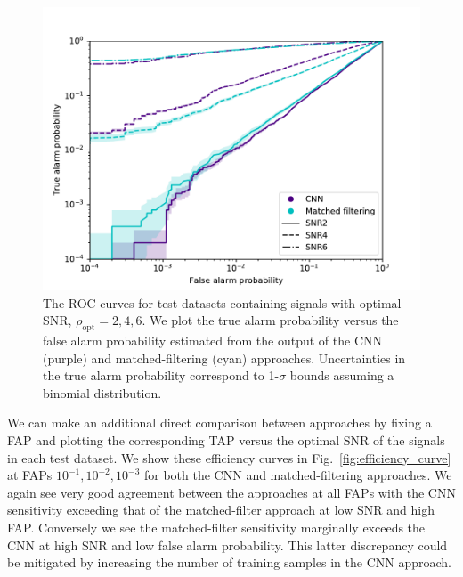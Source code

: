 %
%
\begin{figure}[]
\includegraphics[width=\columnwidth] {figures/ROC_curves.pdf}
\caption[Receiver operating characteristic curves for test datasets containing signals with optimal signal to noise ratio, $\rho_{\mathrm{opt}}=2,4,6$]{The \ac{ROC} curves for test datasets containing signals with optimal \ac{SNR}, $\rho_{\mathrm{opt}}=2,4,6$. We plot the true alarm probability versus the false alarm probability estimated from the output of the \ac{CNN} (purple) and matched-filtering (cyan) approaches. Uncertainties in the true alarm probability correspond to 1-$\sigma$ bounds assuming a binomial distribution.} \label{fig:ROC_curves} 
\end{figure}

%
%
We can make an additional direct comparison between approaches by fixing a 
\ac{FAP} and plotting the corresponding \ac{TAP} versus the optimal 
\ac{SNR} of the signals in each test dataset. We show these efficiency 
curves in Fig.~\ref{fig:efficiency_curve} at \ac{FAP}s 
$10^{-1},10^{-2},10^{-3}$ for both the \ac{CNN} and matched-filtering 
approaches. We again see very good agreement between the approaches at all 
\ac{FAP}s with the \ac{CNN} sensitivity exceeding that of the 
matched-filter approach at low \ac{SNR} and high \ac{FAP}. 
Conversely we see the matched-filter sensitivity marginally exceeds 
the \ac{CNN} at high \ac{SNR} and low false alarm probability. 
This latter discrepancy could be mitigated by increasing the number 
of training samples in the CNN approach.

